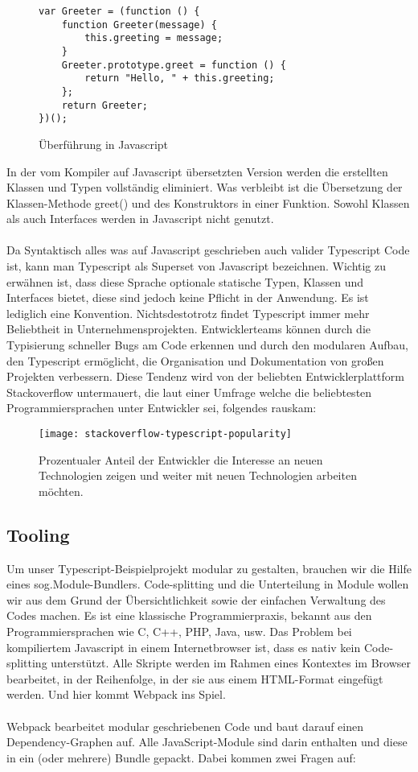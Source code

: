 \begin{figure}[t]
\begin{lstlisting}
var Greeter = (function () {
    function Greeter(message) {
        this.greeting = message;
    }
    Greeter.prototype.greet = function () {
        return "Hello, " + this.greeting;
    };
    return Greeter;
})(); 
\end{lstlisting}
\caption{Überführung in Javascript \cite{typescript-example}}
\end{figure}
In der vom Kompiler auf Javascript übersetzten Version werden die erstellten Klassen und Typen vollständig eliminiert. Was verbleibt ist die Übersetzung der Klassen-Methode greet() und des Konstruktors in einer Funktion. Sowohl Klassen als auch Interfaces werden in Javascript nicht genutzt.
\\\\
Da Syntaktisch alles was auf Javascript geschrieben auch valider Typescript Code ist, kann man Typescript als Superset von Javascript bezeichnen.
Wichtig zu erwähnen ist, dass diese Sprache optionale statische Typen, Klassen und Interfaces bietet, diese sind jedoch keine Pflicht in der Anwendung. Es ist lediglich eine Konvention.
Nichtsdestotrotz findet Typescript immer mehr Beliebtheit in Unternehmensprojekten. Entwicklerteams können durch die Typisierung schneller Bugs am Code erkennen und durch den modularen Aufbau, den Typescript ermöglicht, die Organisation und Dokumentation von großen Projekten verbessern. Diese Tendenz wird von der beliebten Entwicklerplattform Stackoverflow untermauert, die laut einer Umfrage welche die beliebtesten Programmiersprachen unter Entwickler sei, folgendes rauskam:

\begin{figure}[H]
\centering
\texttt{[image: stackoverflow-typescript-popularity]}
\caption{Prozentualer Anteil der Entwickler die Interesse an neuen Technologien zeigen und weiter mit neuen Technologien arbeiten möchten. \cite{typescript-survey}}
\end{figure}

\subsection{Tooling}

Um unser Typescript-Beispielprojekt modular zu gestalten, brauchen wir die Hilfe eines sog.\glqq Module-Bundlers\grqq{}. Code-splitting und die Unterteilung in Module wollen wir aus dem Grund der Übersichtlichkeit sowie der einfachen Verwaltung des Codes machen. Es ist eine klassische Programmierpraxis, bekannt aus den Programmiersprachen wie C, C++, PHP, Java, usw. Das Problem bei kompiliertem Javascript in einem Internetbrowser ist, dass es nativ kein Code-splitting unterstützt. Alle Skripte werden im Rahmen eines Kontextes im Browser bearbeitet, in der Reihenfolge, in der sie aus einem HTML-Format eingefügt werden. Und hier kommt Webpack ins Spiel. \cite{webpack-einfuehrung}
\\\\
Webpack bearbeitet modular geschriebenen Code und baut darauf einen Dependency-Graphen auf. Alle JavaScript-Module sind darin enthalten und diese in ein (oder mehrere) Bundle gepackt. Dabei kommen zwei Fragen auf:

